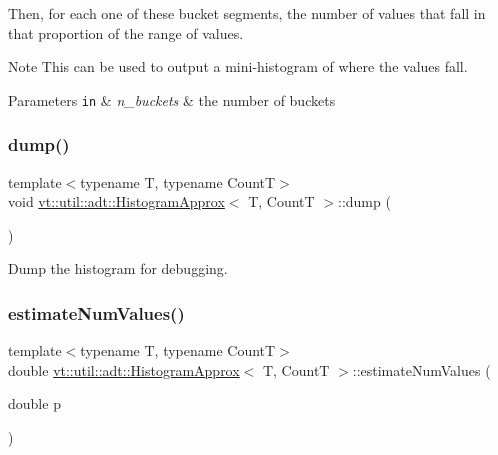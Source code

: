 Then, for each one of these bucket segments, the number of values that fall in that proportion of the range of values.

\begin{DoxyNote}{Note}
This can be used to output a mini-\/histogram of where the values fall.
\end{DoxyNote}

\begin{DoxyParams}[1]{Parameters}
\mbox{\tt in}  & {\em n\+\_\+buckets} & the number of buckets \\
\hline
\end{DoxyParams}
\mbox{\label{structvt_1_1util_1_1adt_1_1_histogram_approx_a26c7f2922772baf00c50dcf5e88ad023}} 
\subsubsection{\texorpdfstring{dump()}{dump()}}
{\footnotesize\ttfamily template$<$typename T, typename CountT$>$ \\
void \hyperlink{structvt_1_1util_1_1adt_1_1_histogram_approx}{vt\+::util\+::adt\+::\+Histogram\+Approx}$<$ T, CountT $>$\+::dump (\begin{DoxyParamCaption}{ }\end{DoxyParamCaption})\hspace{0.3cm}{\ttfamily [inline]}}



Dump the histogram for debugging. 

\mbox{\label{structvt_1_1util_1_1adt_1_1_histogram_approx_adc37c23f9b9d846e4fb0f7b788cb54de}} 
\subsubsection{\texorpdfstring{estimate\+Num\+Values()}{estimateNumValues()}}
{\footnotesize\ttfamily template$<$typename T, typename CountT$>$ \\
double \hyperlink{structvt_1_1util_1_1adt_1_1_histogram_approx}{vt\+::util\+::adt\+::\+Histogram\+Approx}$<$ T, CountT $>$\+::estimate\+Num\+Values (\begin{DoxyParamCaption}\item[{double}]{p }\end{DoxyParamCaption})\hspace{0.3cm}{\ttfamily [inline]}}



